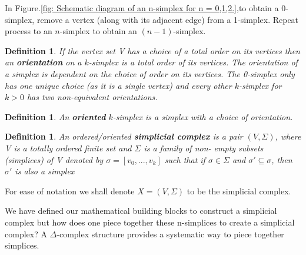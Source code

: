 \documentclass{article}
\newtheorem{definition}[theorem]{Definition}
\begin{document}
In Figure.\ref{fig: Schematic diagram of an n-simplex for n = 0,1,2.},to obtain a 0-simplex, remove a vertex (along with its adjacent edge) from a 1-simplex. Repeat process to an $n$-simplex to obtain an $(n-1)$-simplex. 
\begin{definition} If the vertex set V has a choice of a total order on its vertices then an \textbf{orientation} on a $k$-simplex is a total order of its vertices. The orientation of a simplex is dependent on the choice of order on its vertices. The 0-simplex only has one unique choice (as it is a single vertex) and every other $k$-simplex for $k>0$ has two non-equivalent orientations.
\end{definition}
\begin{definition}An \textbf{oriented} $k$-simplex is a simplex with a choice of orientation.
\end{definition}
\begin{definition}An ordered/oriented \textbf{simplicial complex} is a pair $(V,\Sigma)$, where V is a totally ordered finite set and $\Sigma$ is a family of non- empty subsets (simplices) of V denoted by $\sigma = [v_0,...,v_k] $ such that if $\sigma \in \Sigma$ and $\sigma' \subseteq \sigma$, then $\sigma'$ is also a simplex
\end{definition}
For ease of notation we shall denote $X = (V, \Sigma)$ to be the simplicial complex.


We have defined our mathematical building blocks to construct a simplicial complex but how does one piece together these n-simplices to create a simplicial complex? A $\Delta$-complex structure provides a systematic way to piece together simplices.\break
\end{document}
